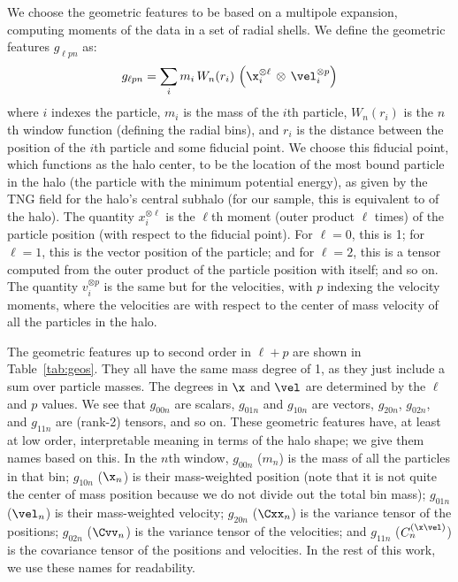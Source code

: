 We choose the geometric features to be based on a multipole expansion, computing moments of the data in a set of radial shells. 
We define the geometric features $g_{\ell p n}$ as: 
\label{eq:geo}
\begin{equation}
    g_{\ell p n} = \sum_i m_i \, W_n(r_i) \, \left( \x_i^{\otimes \ell} \, \otimes \, \vel_i^{\otimes p} \right)
\end{equation}
where $i$ indexes the particle, $m_i$ is the mass of the $i$th particle, $W_n(r_i)$ is the $n$th window function (defining the radial bins), and $r_i$ is the distance between the position of the $i$th particle and some fiducial point.
We choose this fiducial point, which functions as the halo center, to be the location of the most bound particle in the halo (the particle with the minimum potential energy), as given by the TNG field  for the halo's central subhalo (for our sample, this is equivalent to  of the \dark halo).
The quantity $x_i^{\otimes \ell}$ is the $\ell$th moment (outer product $\ell$ times) of the particle position (with respect to the fiducial point).
For $\ell = 0$, this is 1; for $\ell = 1$, this is the vector position of the particle; and for $\ell = 2$, this is a tensor computed from the outer product of the particle position with itself; and so on.
The quantity $v_i^{\otimes p}$ is the same but for the velocities, with $p$ indexing the velocity moments, where the velocities are with respect to the center of mass velocity of all the particles in the halo.

The geometric features up to second order in $\ell + p$ are shown in Table~\ref{tab:geos}.
They all have the same mass degree of 1, as they just include a sum over particle masses.
The degrees in $\x$ and $\vel$ are determined by the $\ell$ and $p$ values.
We see that $g_{00n}$ are scalars, $g_{01n}$ and $g_{10n}$ are vectors, $g_{20n}$, $g_{02n}$, and $g_{11n}$ are (rank-2) tensors, and so on.
These geometric features have, at least at low order, interpretable meaning in terms of the halo shape; we give them names based on this.
In the $n$th window, $g_{00n}$ ($m_n$) is the mass of all the particles in that bin; $g_{10n}$ ($\x_n$) is their mass-weighted position (note that it is not quite the center of mass position because we do not divide out the total bin mass); $g_{01n}$ ($\vel_n$) is their mass-weighted velocity; $g_{20n}$ ($\Cxx_n$) is the variance tensor of the positions; $g_{02n}$ ($\Cvv_n$) is the variance tensor of the velocities; and $g_{11n}$ ($C^{(\x\vel)}_n$) is the covariance tensor of the positions and velocities.
In the rest of this work, we use these names for readability.

